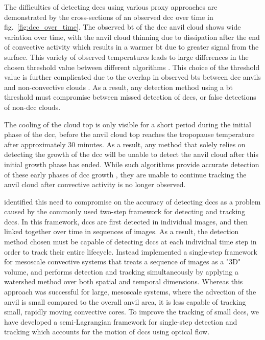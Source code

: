 The difficulties of detecting \acrshort{dcc}s using various proxy approaches are demonstrated by the cross-sections of an observed \acrshort{dcc} over time in fig.~\ref{fig:dcc_over_time}.
The observed \acrshort{bt} of the \acrshort{dcc} anvil cloud shows wide variation over time, with the anvil cloud thinning due to dissipation after the end of convective activity which results in a warmer \acrshort{bt} due to greater signal from the surface.
This variety of observed temperatures leads to large differences in the chosen threshold value between different algorithms \citep[see discussion in][]{bennartz_convective_2012}.
This choice of the threshold value is further complicated due to the overlap in observed \acrshort{bt}s between \acrshort{dcc} anvils and non-convective clouds \citep{konduru_new_2013}.
As a result, any detection method using a \acrshort{bt} threshold must compromise between missed detection of \acrshort{dcc}s, or false detections of non-\acrshort{dcc} clouds.

The cooling of the cloud top is only visible for a short period during the initial phase of the \acrshort{dcc}, before the anvil cloud top reaches the tropopause temperature after approximately 30 minutes.
As a result, any method that solely relies on detecting the growth of the \acrshort{dcc} will be unable to detect the anvil cloud after this initial growth phase has ended.
While such algorithms provide accurate detection of these early phases of \acrshort{dcc} growth \citep{zinner_validation_2013}, they are unable to continue tracking the anvil cloud after convective activity is no longer observed.

\citet{fiolleau_algorithm_2013} identified this need to compromise on the accuracy of detecting \acrshort{dcc}s as a problem caused by the commonly used two-step framework for detecting and tracking \acrshort{dcc}s.
In this framework, \acrshort{dcc}s are first detected in individual images, and then linked together over time in sequences of images.
As a result, the detection method chosen must be capable of detecting \acrshort{dcc}s at each individual time step in order to track their entire lifecycle.
Instead \citet{fiolleau_algorithm_2013} implemented a single-step framework for mesoscale convective systems that treats a sequence of images as a "3D" volume, and performs detection and tracking simultaneously by applying a watershed method over both spatial and temporal dimensions.
Whereas this approach was successful for large, mesoscale systems, where the advection of the anvil is small compared to the overall anvil area, it is less capable of tracking small, rapidly moving convective cores.
To improve the tracking of small \acrshort{dcc}s, we have developed a semi-Lagrangian framework for single-step detection and tracking which accounts for the motion of \acrshort{dcc}s using optical flow.


